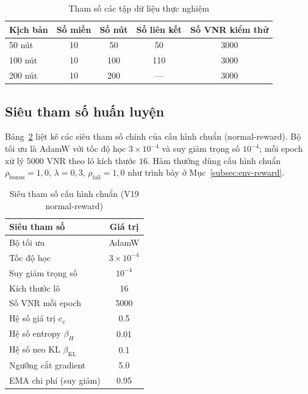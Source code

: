 \documentclass[../DoAn.tex]{subfiles}
\begin{document}
\begin{table}[H]
\centering
\caption{Tham số các tập dữ liệu thực nghiệm}
\label{tab:datasets}
\begin{tabular}{lcccc}
\toprule
\textbf{Kịch bản} & \textbf{Số miền} & \textbf{Số nút} & \textbf{Số liên kết} & \textbf{Số VNR kiểm thử} \\
\midrule
50 nút  & 10 & 50  & 50  & 3000 \\
100 nút & 10 & 100 & 110 & 3000 \\
200 nút & 10 & 200 & --- & 3000 \\
\bottomrule
\end{tabular}
\end{table}

\subsection{Siêu tham số huấn luyện}
\label{subsec:exp-hp}

Bảng~\ref{tab:hyperparams} liệt kê các siêu tham số chính của cấu hình chuẩn (normal-reward). Bộ tối ưu là AdamW với tốc độ học $3\times10^{-4}$ và suy giảm trọng số $10^{-4}$; mỗi epoch xử lý $5000$ VNR theo lô kích thước $16$. Hàm thưởng dùng cấu hình chuẩn $\rho_{\text{bonus}}=1{,}0$, $\lambda=0{,}3$, $\rho_{\text{fail}}=1{,}0$ như trình bày ở Mục~\ref{subsec:env-reward}.

\begin{table}[H]
\centering
\caption{Siêu tham số cấu hình chuẩn (V19 normal-reward)}
\label{tab:hyperparams}
\begin{tabular}{lc}
\toprule
\textbf{Siêu tham số} & \textbf{Giá trị} \\
\midrule
Bộ tối ưu & AdamW \\
Tốc độ học & $3\times10^{-4}$ \\
Suy giảm trọng số & $10^{-4}$ \\
Kích thước lô & 16 \\
Số VNR mỗi epoch & 5000 \\
Hệ số giá trị $c_v$ & 0.5 \\
Hệ số entropy $\beta_H$ & 0.01 \\
Hệ số neo KL $\beta_{\text{KL}}$ & 0.1 \\
Ngưỡng cắt gradient & 5.0 \\
EMA chi phí (suy giảm) & 0.95 \\
\bottomrule
\end{tabular}
\end{table}
\end{document}
